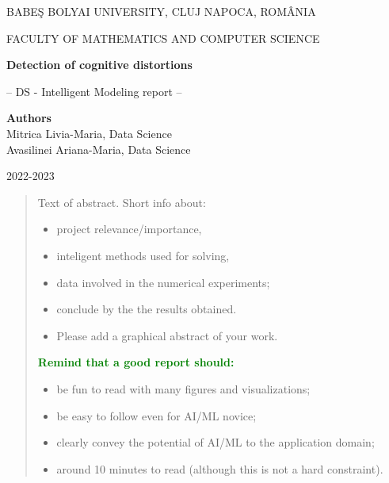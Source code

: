 \documentclass[runningheads,a4paper,11pt]{report}
\begin{document}
\begin{titlepage}
\sloppy

\begin{center}
BABE\c S BOLYAI UNIVERSITY, CLUJ NAPOCA, ROM\^ ANIA

FACULTY OF MATHEMATICS AND COMPUTER SCIENCE

\vspace{6cm}

\Huge \textbf{Detection of cognitive distortions}

\vspace{1cm}

\normalsize -- DS - Intelligent Modeling report --

\end{center}


\vspace{5cm}

\begin{flushright}
\Large{\textbf{Authors}}\\
Mitrica Livia-Maria, Data Science \\
Avasilinei Ariana-Maria, Data Science
\end{flushright}

\vspace{4cm}

\begin{center}
2022-2023
\end{center}

\end{titlepage}


\begin{abstract}
	Text of abstract. Short info about: 
	\begin{itemize}
		\item project relevance/importance, 
		\item inteligent methods used for solving, 
		\item data involved in the numerical experiments; 
		\item conclude by the the results obtained.
		\item Please add a graphical abstract of your work. 
	\end{itemize}

	

\noindent
\textbf{\textcolor{green}{Remind that a good report should:}}
\begin{itemize}	
	\item be fun to read with many figures and visualizations;
	\item be easy to follow even for AI/ML novice;
	\item clearly convey the potential of AI/ML to the application domain;
	\item around 10 minutes to read (although this is not a hard constraint).
\end{itemize}

\end{abstract}
\end{document}
